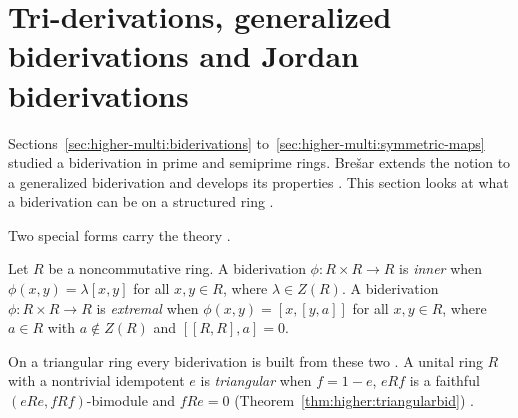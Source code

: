\section{Tri-derivations, generalized biderivations and Jordan biderivations}\label{sec:higher-multi:tri-generalized}

Sections~\ref{sec:higher-multi:biderivations}
to~\ref{sec:higher-multi:symmetric-maps} studied a biderivation in prime and
semiprime rings. Brešar extends the notion to a generalized biderivation and
develops its properties \cite[reference~5]{Bresar1995GBid}. This section looks
at what a biderivation can be on a structured ring
\cite[p.~1952]{Wang2016Bideriv}.

Two special forms carry the theory \cite[p.~1952]{Wang2016Bideriv}.

\begin{definition}\label{def:higher:inner-extremal}
Let $R$ be a noncommutative ring. A biderivation $\phi\colon R\times R\to R$
is \emph{inner} when $\phi(x,y)=\lambda[x,y]$ for all $x,y\in R$, where
$\lambda\in Z(R)$. A biderivation $\phi\colon R\times R\to R$ is
\emph{extremal} when $\phi(x,y)=[x,[y,a]]$ for all $x,y\in R$, where $a\in R$
with $a\notin Z(R)$ and $[[R,R],a]=0$.
\end{definition}

On a triangular ring every biderivation is built from these two
\cite[p.~1955]{Wang2016Bideriv}. A unital ring $R$ with a nontrivial
idempotent $e$ is \emph{triangular} when $f=1-e$, $eRf$ is a faithful
$(eRe,fRf)$-bimodule and $fRe=0$ (Theorem~\ref{thm:higher:triangularbid}) \cite[p.~1953]{Wang2016Bideriv}.

